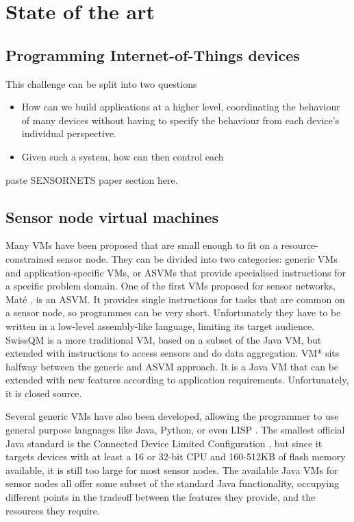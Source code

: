 \chapter{State of the art}

\section{Programming Internet-of-Things devices}

This challenge can be split into two questions

\begin{itemize}
	\item How can we build applications at a higher level, coordinating the behaviour of many devices without having to specify the behaviour from each device's individual perspective.
	\item Given such a system, how can then control each 
\end{itemize}

paste SENSORNETS paper section here.



\section{Sensor node virtual machines}
Many VMs have been proposed that are small enough to fit on a resource-constrained sensor node. They can be divided into two categories: generic VMs and application-specific VMs, or ASVMs \cite{Culler05} that provide specialised instructions for a specific problem domain. One of the first VMs proposed for sensor networks, Mat\'e \cite{Levis:2002ku}, is an ASVM. It provides single instructions for tasks that are common on a sensor node, so programmes can be very short. Unfortunately they have to be written in a low-level assembly-like language, limiting its target audience. SwissQM \cite{Muller:2007fs} is a more traditional VM, based on a subset of the Java VM, but extended with instructions to access sensors and do data aggregation. VM* \cite{Koshy:2005ww} sits halfway between the generic and ASVM approach. It is a Java VM that can be extended with new features according to application requirements. Unfortunately, it is closed source.

Several generic VMs have also been developed, allowing the programmer to use general purpose languages like Java, Python, or even LISP \cite{Harbaum, Brouwers:2009cj, Aslam:2008, Evers:2010ur}. The smallest official Java standard is the Connected Device Limited Configuration \cite{CLDC}, but since it targets devices with at least a 16 or 32-bit CPU and 160-512KB of flash memory available, it is still too large for most sensor nodes. The available Java VMs for sensor nodes all offer some subset of the standard Java functionality, occupying different points in the tradeoff between the features they provide, and the resources they require.



